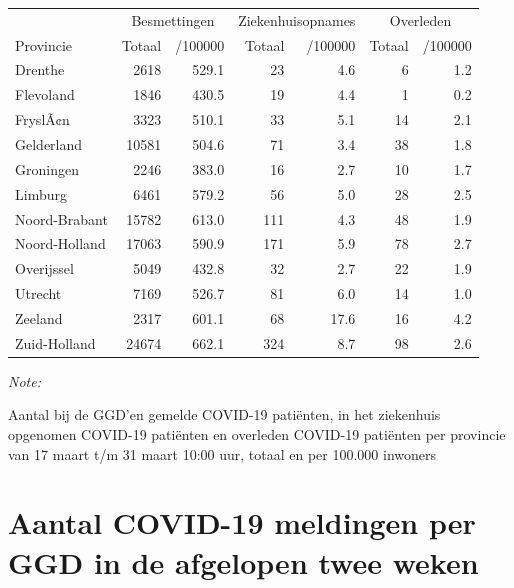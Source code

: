 \documentclass[
  english,
  man,floatsintext]{apa6}
\begin{document}
\begin{table}
\centering
\begin{threeparttable}
\begin{tabular}{lrrrrrr}
\toprule
\multicolumn{1}{c}{ } & \multicolumn{2}{c}{Besmettingen} & \multicolumn{2}{c}{Ziekenhuisopnames} & \multicolumn{2}{c}{Overleden} \\
\cmidrule(l{3pt}r{3pt}){2-3} \cmidrule(l{3pt}r{3pt}){4-5} \cmidrule(l{3pt}r{3pt}){6-7}
Provincie & Totaal & /100000 & Totaal & /100000 & Totaal & /100000\\
\midrule
Drenthe & 2618 & 529.1 & 23 & 4.6 & 6 & 1.2\\
Flevoland & 1846 & 430.5 & 19 & 4.4 & 1 & 0.2\\
FryslÃ¢n & 3323 & 510.1 & 33 & 5.1 & 14 & 2.1\\
Gelderland & 10581 & 504.6 & 71 & 3.4 & 38 & 1.8\\
Groningen & 2246 & 383.0 & 16 & 2.7 & 10 & 1.7\\
Limburg & 6461 & 579.2 & 56 & 5.0 & 28 & 2.5\\
Noord-Brabant & 15782 & 613.0 & 111 & 4.3 & 48 & 1.9\\
Noord-Holland & 17063 & 590.9 & 171 & 5.9 & 78 & 2.7\\
Overijssel & 5049 & 432.8 & 32 & 2.7 & 22 & 1.9\\
Utrecht & 7169 & 526.7 & 81 & 6.0 & 14 & 1.0\\
Zeeland & 2317 & 601.1 & 68 & 17.6 & 16 & 4.2\\
Zuid-Holland & 24674 & 662.1 & 324 & 8.7 & 98 & 2.6\\
\bottomrule
\end{tabular}
\begin{tablenotes}
\item \textit{Note: } 
\item Aantal bij de GGD’en gemelde COVID-19 patiënten, in het ziekenhuis opgenomen COVID-19 patiënten en overleden COVID-19 patiënten per provincie van 17 maart t/m 31 maart 10:00 uur, totaal en per 100.000 inwoners
\end{tablenotes}
\end{threeparttable}
\end{table}

\newpage

\hypertarget{aantal-covid-19-meldingen-per-ggd-in-de-afgelopen-twee-weken}{%
\section{Aantal COVID-19 meldingen per GGD in de afgelopen twee weken}\label{aantal-covid-19-meldingen-per-ggd-in-de-afgelopen-twee-weken}}
\end{document}
